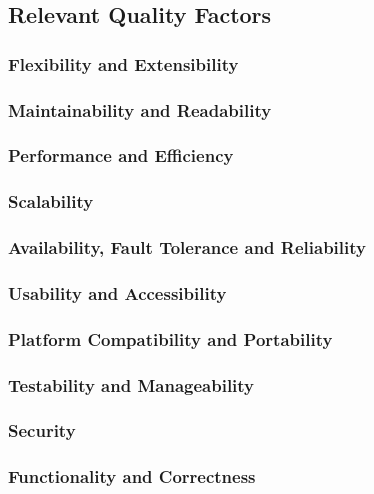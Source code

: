 \subsection*{Relevant Quality Factors}

\subsubsection*{Flexibility and Extensibility} 

\subsubsection*{Maintainability and Readability} 

\subsubsection*{Performance and Efficiency} 

\subsubsection*{Scalability} 

\subsubsection*{Availability, Fault Tolerance and Reliability} 

\subsubsection*{Usability and Accessibility} 

\subsubsection*{Platform Compatibility and Portability} 

\subsubsection*{Testability and Manageability} 

\subsubsection*{Security} 

\subsubsection*{Functionality and Correctness} 

